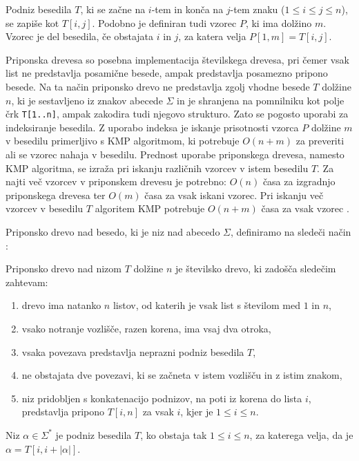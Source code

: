 Podniz besedila $T$, ki se začne na $i$-tem in konča na $j$-tem znaku ($1\leq i \leq j \leq n$), se zapiše kot $T[i,j]$.  Podobno je definiran tudi vzorec $P$, ki ima dolžino $m$.  Vzorec je del besedila, če obstajata $i$ in $j$, za katera velja $P[1,m]=T[i,j]$.

Priponska drevesa so posebna implementacija številskega drevesa, pri čemer vsak list ne predstavlja posamične besede, ampak predstavlja posamezno pripono besede. Na ta način priponsko drevo ne predstavlja zgolj vhodne besede $T$ dolžine $n$, ki je sestavljeno iz znakov abecede $\Sigma$ in je shranjena na pomnilniku kot polje črk \texttt{T[1..n]}, ampak zakodira tudi njegovo strukturo. Zato se pogosto uporabi za indeksiranje besedila. Z uporabo indeksa je iskanje prisotnosti vzorca $P$ dolžine $m$ v besedilu primerljivo s KMP algoritmom, ki potrebuje $O(n+m)$ za preveriti ali se vzorec nahaja v besedilu. Prednost uporabe priponskega drevesa, namesto KMP algoritma, se izraža pri iskanju različnih vzorcev v istem besedilu $T$. Za najti več vzorcev v priponskem drevesu je potrebno: $O(n)$ časa za izgradnjo priponskega drevesa ter $O(m)$ časa za vsak iskani vzorec. Pri iskanju več vzorcev v besedilu $T$ algoritem KMP potrebuje $O(n+m)$ časa za vsak vzorec \cite{Gusfield1997,KMP}.


%
Priponsko drevo nad besedo, ki je niz nad abecedo $\Sigma$, definiramo na sledeči način \cite{Gusfield1997}:

\begin{defi}\label{def:priposkoDrevo}
    Priponsko drevo nad nizom $T$ dolžine $n$ je številsko drevo, ki zadošča sledečim zahtevam:
    \begin{enumerate}
        \item drevo ima natanko $n$ listov, od katerih je vsak list s številom med $1$ in $n$,
        \item vsako notranje vozlišče, razen korena, ima vsaj dva otroka,
        \item vsaka povezava predstavlja neprazni podniz besedila $T$,
        \item ne obstajata dve povezavi, ki se začneta v istem vozlišču in z istim znakom,
        \item niz pridobljen s konkatenacijo podnizov, na poti iz korena do lista $i$, predstavlja pripono $T[i,n]$ za vsak $i$, kjer je $1 \le i\le n$.        
    \end{enumerate}
\end{defi}

\begin{defi}
    Niz $\alpha\in\Sigma^*$ je podniz besedila $T$, ko obstaja tak $1\le i\le n$, za katerega velja, da je  $\alpha=T[i,i+|\alpha|]$. 
\end{defi}

